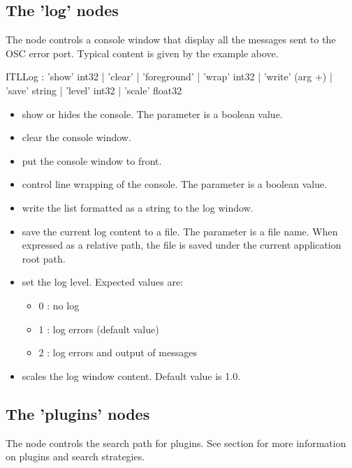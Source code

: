 \documentclass[a4paper,twoside]{report}
\newcommand{\subsublevel}[1]	{\subsection{#1}}
\begin{document}
\subsublevel{The 'log' nodes}
\label{ITLlog}

The  node controls a console window that display all the messages sent to the OSC error port. Typical content is given by the example above.


\begin{rail}
ITLLog : 'show'  int32
		| 'clear'
		| 'foreground'
		| 'wrap' int32
		| 'write' (arg +)
		| 'save' string
		| 'level' int32
		| 'scale' float32
\end{rail}

\begin{itemize}
\item {} show or hides the console. The parameter is a boolean value.
\item {} clear the console window.
\item {} put the console window to front.
\item {} control line wrapping of the console. The parameter is a boolean value.
\item {} write the  list formatted as a string to the log window.
\item {} save the current log content to a file. The parameter is a file name. When expressed as a relative path, the file is saved under the current application root path.
\item {} set the log level. Expected values are: 
\begin{itemize}
\item 0 : no log
\item 1 : log errors (default value)
\item 2 : log errors and output of  messages
\end{itemize}
\item {} scales the log window content. Default value is 1.0.
\end{itemize}


\subsublevel{The 'plugins' nodes}
\label{ITLplugins}

The  node controls the search path for plugins. See section  for more information on plugins and search strategies.

\end{document}
